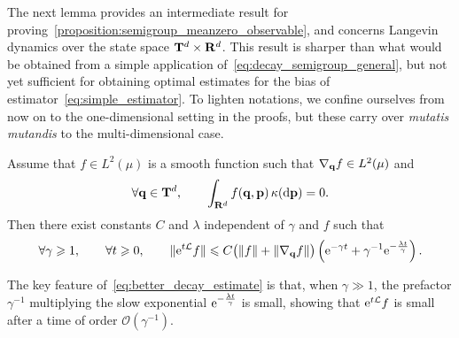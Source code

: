 \documentclass[11pt,a4paper]{article}
\begin{document}
The next lemma provides an intermediate result for proving~\cref{proposition:semigroup_meanzero_observable},
and concerns Langevin dynamics over the state space $\mathbf T^d \times \mathbf R^d$.
This result is sharper than what would be obtained from a simple application of~\eqref{eq:decay_semigroup_general},
but not yet sufficient for obtaining optimal estimates for the bias of estimator~\eqref{eq:simple_estimator}.
To lighten notations,
we confine ourselves from now on to the one-dimensional setting in the proofs,
but these carry over \emph{mutatis mutandis} to the multi-dimensional case.
\begin{lemma}
    \label{lemma:initial_lemma}
    Assume that $f \in L^2(\mu)$ is a smooth function such that $\nabla_{\boldsymbol{\mathbf q}} f \in L^2(\mu)$ and
    \begin{equation}
        \label{eq:assumption_f}
        \forall \boldsymbol{\mathbf q} \in \mathbf T^d, \qquad
        \int_{\mathbf R^d} f(\boldsymbol{\mathbf q}, \boldsymbol{\mathbf p}) \, \kappa(\mathrm d \boldsymbol{\mathbf p}) = 0.
    \end{equation}
    Then there exist constants $C$ and $\lambda$ independent of $\gamma$ and $f$ such that
    \begin{align}
        \label{eq:better_decay_estimate}
        \forall \gamma \geq 1, \qquad
        \forall t \geq 0, \qquad
        \norm*{\e^{t\mathcal L} f}
        \leq C \bigl( \norm{f} + \norm{\grad_{\vect q} f} \bigr)
        \left( \e^{- \gamma t} + \gamma^{-1} \e^{-\frac{\lambda t}{\gamma}} \right).
    \end{align}
\end{lemma}
The key feature of~\eqref{eq:better_decay_estimate} is that,
when $\gamma \gg 1$,
the prefactor $\gamma^{-1}$ multiplying the slow exponential $\mathrm{e}^{-\frac{\lambda t}{\gamma}}$ is small,
showing that $\mathrm{e}^{t\mathcal L} f$ is small after a time of order $\mathcal O(\gamma^{-1})$.
\end{document}
